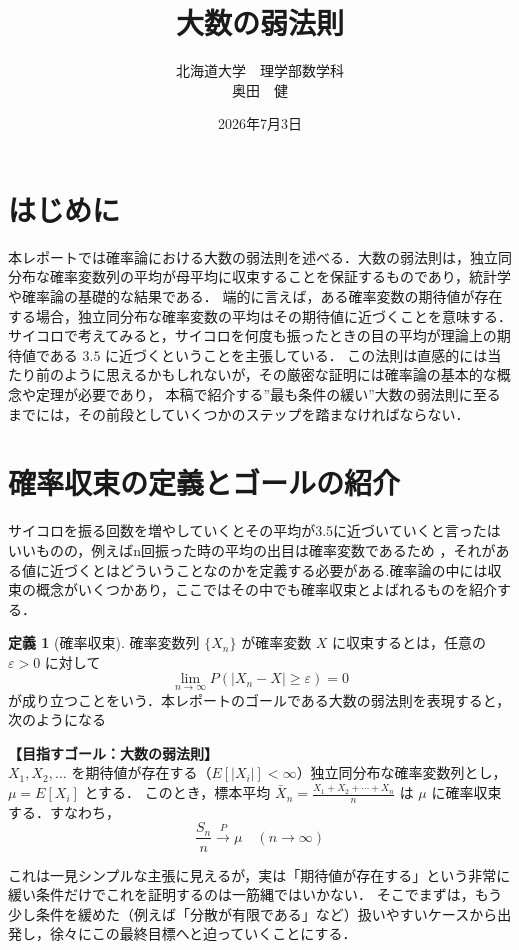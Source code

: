 \documentclass[dvipdfmx]{jsarticle}
\title{\bf 大数の弱法則}
\author{北海道大学　理学部数学科 \\ 奥田　健}
\date{2026年7月3日}
\numberwithin{equation}{section}
\theoremstyle{definition}
\newtheorem{dfn}[thm]{定義}
\newcommand{\0}{\bm{0}}
\newcommand{\1}{\bm{1}}
\begin{document}
\maketitle
\section{はじめに}
本レポートでは確率論における大数の弱法則を述べる．大数の弱法則は，独立同分布な確率変数列の平均が母平均に収束することを保証するものであり，統計学や確率論の基礎的な結果である．
端的に言えば，ある確率変数の期待値が存在する場合，独立同分布な確率変数の平均はその期待値に近づくことを意味する．
サイコロで考えてみると，サイコロを何度も振ったときの目の平均が理論上の期待値である $3.5$ に近づくということを主張している．
この法則は直感的には当たり前のように思えるかもしれないが，その厳密な証明には確率論の基本的な概念や定理が必要であり，
本稿で紹介する”最も条件の緩い”大数の弱法則に至るまでには，その前段としていくつかのステップを踏まなければならない．
\section{確率収束の定義とゴールの紹介}
サイコロを振る回数を増やしていくとその平均が3.5に近づいていくと言ったはいいものの，例えばn回振った時の平均の出目は確率変数であるため
，それがある値に近づくとはどういうことなのかを定義する必要がある.確率論の中には収束の概念がいくつかあり，ここではその中でも確率収束とよばれるものを紹介する．
\begin{dfn}[確率収束]
  確率変数列 $\{X_n\}$ が確率変数 $X$ に収束するとは，任意の $\varepsilon > 0$ に対して
  \[
    \lim_{n \to \infty} P(|X_n - X| \geq \varepsilon) = 0
  \]
  が成り立つことをいう．本レポートのゴールである大数の弱法則を表現すると，次のようになる
\end{dfn}

\begin{tcolorbox}[
    colback=gray!15,       %
    colframe=gray!15,      %
    arc=1mm,               %
    left=4mm, right=4mm,   %
    top=4mm, bottom=4mm
]
\textbf{【目指すゴール：大数の弱法則】}\\
$X_1, X_2, \dots$ を期待値が存在する（$E[|X_i|] < \infty$）独立同分布な確率変数列とし，$\mu = E[X_i]$ とする．
このとき，標本平均 $\bar{X}_n = \frac{X_1 + X_2 + \cdots + X_n}{n}$ は $\mu$ に確率収束する．すなわち，
\[
  \frac{S_n}{n} \xrightarrow{P} \mu \quad (n \to \infty)
\]
\end{tcolorbox}
これは一見シンプルな主張に見えるが，実は「期待値が存在する」という非常に緩い条件だけでこれを証明するのは一筋縄ではいかない．
そこでまずは，もう少し条件を緩めた（例えば「分散が有限である」など）扱いやすいケースから出発し，徐々にこの最終目標へと迫っていくことにする．
\end{document}
